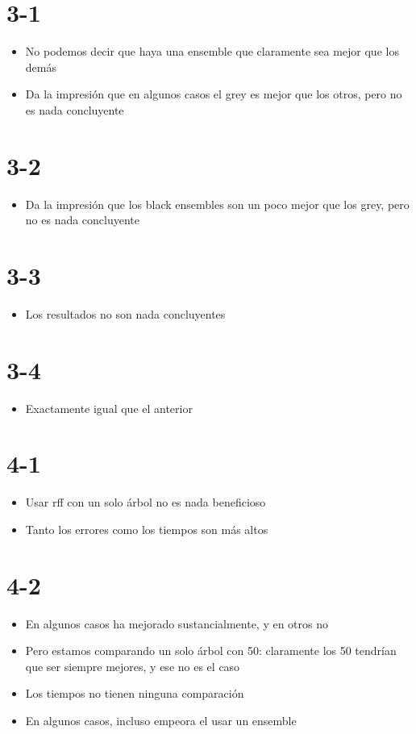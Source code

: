 \begin{note}
\section*{3-1}
\begin{itemize}
  \item No podemos decir que haya una ensemble que claramente sea mejor que los
  demás
  \item Da la impresión que en algunos casos el grey es mejor que los otros,
  pero no es nada concluyente
\end{itemize}

\section*{3-2}
\begin{itemize}
  \item Da la impresión que los black ensembles son un poco mejor que los grey,
  pero no es nada concluyente
\end{itemize}

\section*{3-3}
\begin{itemize}
  \item Los resultados no son nada concluyentes
\end{itemize}

\section*{3-4}
\begin{itemize}
  \item Exactamente igual que el anterior
\end{itemize}

\section*{4-1}
\begin{itemize}
  \item Usar rff con un solo árbol no es nada beneficioso
  \item Tanto los errores como los tiempos son más altos
\end{itemize}

\section*{4-2}
\begin{itemize}
  \item En algunos casos ha mejorado sustancialmente, y en otros no
  \item Pero estamos comparando un solo árbol con 50: claramente los 50
  tendrían que ser siempre mejores, y ese no es el caso
  \item Los tiempos no tienen ninguna comparación
  \item En algunos casos, incluso empeora el usar un ensemble
\end{itemize}


\end{note}

